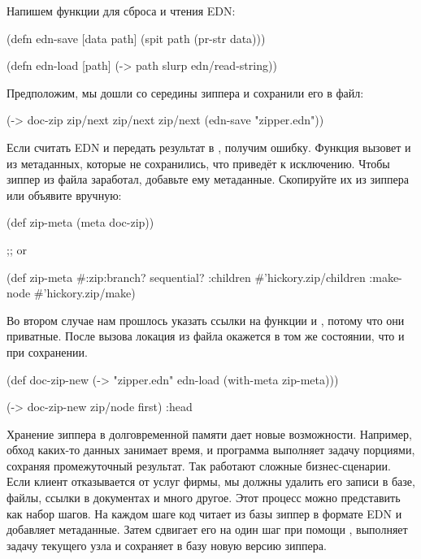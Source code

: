 Напишем функции для сброса и чтения EDN:

\begin{english}
  \begin{clojure}
(defn edn-save [data path]
  (spit path (pr-str data)))

(defn edn-load [path]
  (-> path slurp edn/read-string))
  \end{clojure}
\end{english}

Предположим, мы дошли со середины зиппера и сохранили его в файл:

\begin{english}
  \begin{clojure}
(-> doc-zip
    zip/next
    zip/next
    zip/next
    (edn-save "zipper.edn"))
  \end{clojure}
\end{english}

Если считать EDN и передать результат в , получим ошибку. Функция
вызовет  и  из метаданных, которые не сохранились, что
приведёт к исключению. Чтобы зиппер из файла заработал, добавьте ему
метаданные. Скопируйте их из зиппера или объявите вручную:

\begin{english}
  \begin{clojure}
(def zip-meta (meta doc-zip))

;; or

(def zip-meta
  #:zip{:branch? sequential?
        :children #'hickory.zip/children
        :make-node #'hickory.zip/make})
  \end{clojure}
\end{english}

Во втором случае нам прошлось указать ссылки на функции  и
, потому что они приватные. После вызова  локация из файла
окажется в том же состоянии, что и при сохранении.

\begin{english}
  \begin{clojure}
(def doc-zip-new
  (-> "zipper.edn"
      edn-load
      (with-meta zip-meta)))

(-> doc-zip-new zip/node first)
:head
  \end{clojure}
\end{english}

Хранение зиппера в долговременной памяти дает новые возможности. Например, обход
каких-то данных занимает время, и программа выполняет задачу порциями, сохраняя
промежуточный результат. Так работают сложные бизнес-сценарии. Если клиент
отказывается от услуг фирмы, мы должны удалить его записи в базе, файлы, ссылки
в документах и много другое. Этот процесс можно представить как набор шагов. На
каждом шаге код читает из базы зиппер в формате EDN и добавляет
метаданные. Затем сдвигает его на один шаг при помощи , выполняет
задачу текущего узла и сохраняет в базу новую версию зиппера.

